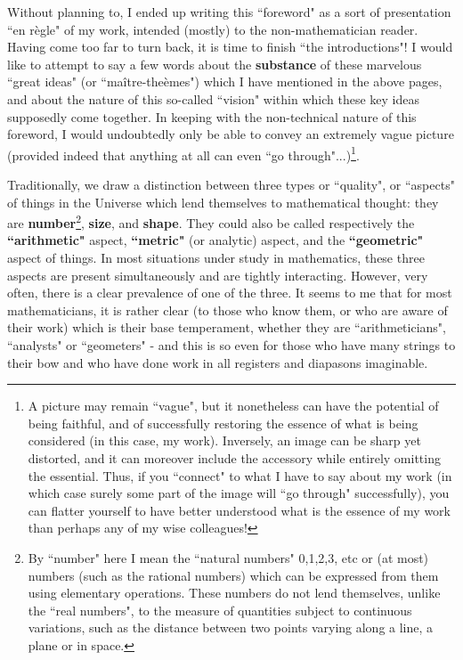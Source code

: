Without planning to, I ended up writing this ``foreword" as a sort of presentation ``en r\`egle" of my work, intended (mostly) to the non-mathematician reader. Having come too far to turn back, it is time to finish ``the introductions"! I would like to attempt to say a few words about the \textbf{substance} of these marvelous ``great ideas" (or ``ma\^itre-the\`emes") which I have mentioned in the above pages, and about the nature of this so-called ``vision" within which these key ideas supposedly come together. In keeping with the non-technical nature of this foreword, I would undoubtedly only be able to convey an extremely vague picture (provided  indeed that anything at all can even ``go through"...)\footnote{A picture may remain ``vague", but it nonetheless can have the potential of being faithful, and of successfully restoring the essence of what is being considered (in this case, my work). Inversely, an image can be sharp yet distorted, and it can moreover include the accessory while entirely omitting the essential. Thus, if you ``connect" to what I have to say about my work (in which case surely some part of the image will ``go through" successfully), you can flatter yourself to have better understood what is the essence of my work than perhaps any of my wise colleagues!}. 

Traditionally, we draw a distinction between three types or ``quality", or ``aspects" of things in the Universe which lend themselves to mathematical thought: they are \textbf{number}\footnote{By ``number" here I mean the ``natural numbers" 0,1,2,3, etc or (at most) numbers (such as the rational numbers) which can be expressed from them using elementary operations. These numbers do not lend themselves, unlike the ``real numbers", to the measure of quantities subject to continuous variations, such as the distance between two points varying along a line, a plane or in space.}, \textbf{size}, and \textbf{shape}. They could also  be called respectively the \textbf{``arithmetic"} aspect, \textbf{``metric"} (or analytic) aspect, and the \textbf{``geometric"} aspect of things. In most situations under study in mathematics, these three aspects are present simultaneously and are tightly interacting. However, very often, there is a clear prevalence of one of the three. It seems to me that for most mathematicians, it is rather clear (to those who know them, or who are aware of their work) which is their base temperament, whether they are ``arithmeticians", ``analysts" or ``geometers" - and this is so even for those who have many strings to their bow and who have done work in all registers and diapasons imaginable.

